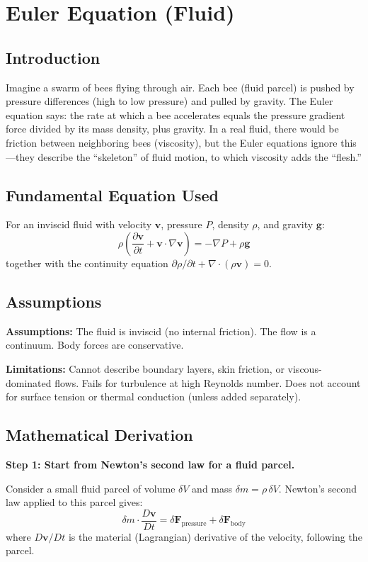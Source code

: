 \documentclass[11pt,openright]{book}
\begin{document}
\chapter{Euler Equation (Fluid)}

\section*{Introduction}

Imagine a swarm of bees flying through air. Each bee (fluid parcel) is pushed by pressure differences (high to low pressure) and pulled by gravity. The Euler equation says: the rate at which a bee accelerates equals the pressure gradient force divided by its mass density, plus gravity. In a real fluid, there would be friction between neighboring bees (viscosity), but the Euler equations ignore this---they describe the ``skeleton'' of fluid motion, to which viscosity adds the ``flesh.''
\section*{Fundamental Equation Used}

For an inviscid fluid with velocity $\mathbf{v}$, pressure $P$, density $\rho$, and gravity $\mathbf{g}$:
\[
\rho\left(\frac{\partial \mathbf{v}}{\partial t} + \mathbf{v} \cdot \nabla \mathbf{v}\right) = -\nabla P + \rho \mathbf{g}
\]
together with the continuity equation $\partial \rho / \partial t + \nabla \cdot (\rho \mathbf{v}) = 0$.
\section*{Assumptions}

\textbf{Assumptions:} The fluid is inviscid (no internal friction). The flow is a continuum. Body forces are conservative.


\textbf{Limitations:} Cannot describe boundary layers, skin friction, or viscous-dominated flows. Fails for turbulence at high Reynolds number. Does not account for surface tension or thermal conduction (unless added separately).


\section*{Mathematical Derivation}

\textbf{Step 1: Start from Newton's second law for a fluid parcel.}

Consider a small fluid parcel of volume $\delta V$ and mass $\delta m = \rho\,\delta V$. Newton's second law applied to this parcel gives:
\begin{equation}
\delta m \cdot \frac{D\mathbf{v}}{Dt} = \delta\mathbf{F}_{\text{pressure}} + \delta\mathbf{F}_{\text{body}}
\end{equation}
where $D\mathbf{v}/Dt$ is the material (Lagrangian) derivative of the velocity, following the parcel.
\end{document}
